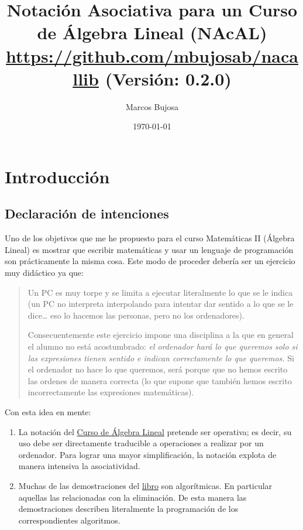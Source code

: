 \documentclass[11pt]{report}
\author{Marcos Bujosa}
\date{\today}
\title{Notación Asociativa para un Curso de Álgebra Lineal (NAcAL)\\\medskip
\large \url{https://github.com/mbujosab/nacallib} (Versión:  0.2.0)}
\begin{document}
\tableofcontents

\maketitle


\section*{Introducción}
\label{sec:org8d486d7}
\subsection*{Declaración de intenciones}
\label{sec:org83f84fa}
Uno de los objetivos que me he propuesto para el curso Matemáticas II (Álgebra Lineal) es mostrar
que escribir matemáticas y usar un lenguaje de programación son prácticamente la misma cosa. Este
modo de proceder debería ser un ejercicio muy didáctico ya que:
\begin{quote}
Un PC es muy torpe y se limita a ejecutar literalmente lo que se le indica (un PC no interpreta
interpolando para intentar dar sentido a lo que se le dice\ldots{} eso lo hacemos las personas, pero no
los ordenadores).

Consecuentemente este ejercicio impone una disciplina a la que en general el alumno no está
acostumbrado: \emph{el ordenador hará lo que queremos solo si las expresiones tienen sentido e indican
correctamente lo que queremos.} Si el ordenador no hace lo que queremos, será porque que no hemos
escrito las ordenes de manera correcta (lo que supone que también hemos escrito incorrectamente las
expresiones matemáticas).
\end{quote}

Con esta idea en mente:

\begin{enumerate}
\item La notación del \href{https://github.com/mbujosab/CursoDeAlgebraLineal/blob/master/libro.pdf}{Curso de Álgebra Lineal} pretende ser operativa; es decir, su uso debe ser
directamente traducible a operaciones a realizar por un ordenador. Para lograr una mayor
simplificación, la notación explota de manera intensiva la asociatividad.

\item Muchas de las demostraciones del \href{https://github.com/mbujosab/CursoDeAlgebraLineal/blob/master/libro.pdf}{libro} son algorítmicas. En particular aquellas las relacionadas
con la eliminación. De esta manera las demostraciones describen literalmente la programación de
los correspondientes algoritmos.
\end{enumerate}
\end{document}
